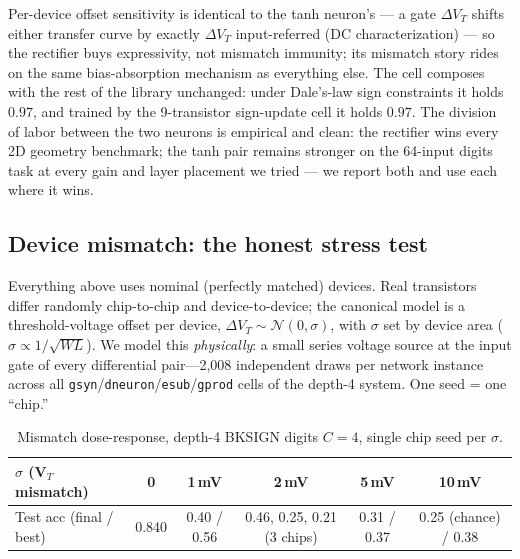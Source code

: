 \documentclass[11pt]{article}
\begin{document}
Per-device offset sensitivity is identical to the tanh neuron's --- a gate $\Delta V_T$ shifts either transfer curve by exactly $\Delta V_T$ input-referred (DC characterization) --- so the rectifier buys expressivity, not mismatch immunity; its mismatch story rides on the same bias-absorption mechanism as everything else. The cell composes with the rest of the library unchanged: under Dale's-law sign constraints it holds $0.97$, and trained by the 9-transistor sign-update cell it holds $0.97$. The division of labor between the two neurons is empirical and clean: the rectifier wins every 2D geometry benchmark; the tanh pair remains stronger on the 64-input digits task at every gain and layer placement we tried --- we report both and use each where it wins.

\subsection{Device mismatch: the honest stress test}
\label{sec:mismatch}

Everything above uses nominal (perfectly matched) devices. Real transistors differ randomly chip-to-chip and device-to-device; the canonical model is a threshold-voltage offset per device, $\Delta V_T \sim \mathcal N(0,\sigma)$, with $\sigma$ set by device area ($\sigma \propto 1/\sqrt{WL}$). We model this \emph{physically}: a small series voltage source at the input gate of every differential pair---2{,}008 independent draws per network instance across all \texttt{gsyn}/\texttt{dneuron}/\texttt{esub}/\texttt{gprod} cells of the depth-4 system. One seed = one ``chip.''

\begin{table}[h]
\centering\small
\begin{tabular}{lccccc}
\toprule
$\sigma$ (V$_T$ mismatch) & 0 & 1\,mV & 2\,mV & 5\,mV & 10\,mV \\
\midrule
Test acc (final / best) & 0.840 & 0.40 / 0.56 & 0.46, 0.25, 0.21 (3 chips) & 0.31 / 0.37 & 0.25 (chance) / 0.38 \\
\bottomrule
\end{tabular}
\caption{Mismatch dose-response, depth-4 BKSIGN digits $C{=}4$, single chip seed per $\sigma$.}
\label{tab:mismatch}
\end{table}
\end{document}
